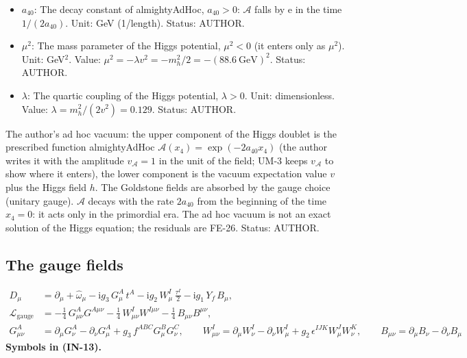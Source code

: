 \documentclass[
  10pt,
]{article}
\begin{document}
\begin{itemize}
  Value: 2.718281828. Status: STANDARD.
\item
  \(a_{40}\): The decay constant of almightyAdHoc, \(a_{40} > 0\):
  \(\mathcal{A}\) falls by \(\mathrm{e}\) in the time \(1/(2a_{40})\).
  Unit: GeV (1/length). Status: AUTHOR.
\item
  \(\mu^2\): The mass parameter of the Higgs potential, \(\mu^2 < 0\)
  (it enters only as \(\mu^2\)). Unit: GeV\(^2\). Value:
  \(\mu^2 = -\lambda v^2 = -m_h^2/2 = -(88.6\ \mathrm{GeV})^2\). Status:
  AUTHOR.
\item
  \(\lambda\): The quartic coupling of the Higgs potential,
  \(\lambda > 0\). Unit: dimensionless. Value:
  \(\lambda = m_h^2/(2v^2) = 0.129\). Status: AUTHOR.
\end{itemize}

The author's ad hoc vacuum: the upper component of the Higgs doublet is
the prescribed function almightyAdHoc
\(\mathcal{A}(x_4) = \exp(-2a_{40}x_4)\) (the author writes it with the
amplitude \(v_{\mathcal{A}} = 1\) in the unit of the field; UM-3 keeps
\(v_{\mathcal{A}}\) to show where it enters), the lower component is the
vacuum expectation value \(v\) plus the Higgs field \(h\). The Goldstone
fields are absorbed by the gauge choice (unitary gauge). \(\mathcal{A}\)
decays with the rate \(2a_{40}\) from the beginning of the time
\(x_4 = 0\): it acts only in the primordial era. The ad hoc vacuum is
not an exact solution of the Higgs equation; the residuals are FE-26.
Status: AUTHOR.

\hypertarget{the-gauge-fields}{%
\subsection{The gauge fields}\label{the-gauge-fields}}

\[
\begin{aligned}
D_\mu &= \partial_\mu + \hat\omega_\mu - \mathrm{i}g_3\,G^A_\mu\,t^A - \mathrm{i}g_2\,W^I_\mu\,\frac{\tau^I}{2}
 - \mathrm{i}g_1\,Y_f\,B_\mu,\\
\mathcal{L}_{\mathrm{gauge}} &= -\frac14\,G^A_{\mu\nu}G^{A\mu\nu} - \frac14\,W^I_{\mu\nu}W^{I\mu\nu} - \frac14\,B_{\mu\nu}B^{\mu\nu},\\
G^A_{\mu\nu} &= \partial_\mu G^A_\nu - \partial_\nu G^A_\mu + g_3\,f^{ABC}G^B_\mu G^C_\nu,\qquad
W^I_{\mu\nu} = \partial_\mu W^I_\nu - \partial_\nu W^I_\mu + g_2\,\epsilon^{IJK}W^J_\mu W^K_\nu,\qquad
B_{\mu\nu} = \partial_\mu B_\nu - \partial_\nu B_\mu
\end{aligned} \tag{IN-13}
\] \textbf{Symbols in (IN-13).}
\end{document}
